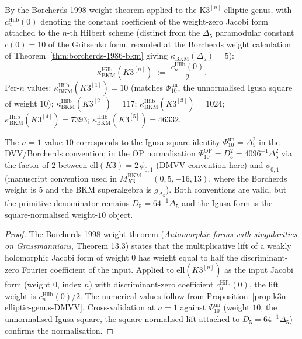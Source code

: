 \begin{proposition}
\label{prop:k3n-borcherds-weight}
By the Borcherds 1998 weight theorem applied to the K$3^{[n]}$ elliptic
genus, with $c_n^{\mathrm{Hilb}}(0)$ denoting the constant coefficient of
the weight-zero Jacobi form attached to the $n$-th Hilbert scheme
\textup{(}distinct from the $\Delta_5$ paramodular constant
$c(0) = 10$ of the Gritsenko form, recorded at the Borcherds weight
calculation of Theorem~\ref{thm:borcherds-1986-bkm} giving
$\kappa_{\mathrm{BKM}}(\Delta_5) = 5$\textup{):}
\[
 \boxed{\;
 \kappa_{\mathrm{BKM}}^{\mathrm{Hilb}}(K3^{[n]})
 \;:=\; \frac{c_n^{\mathrm{Hilb}}(0)}{2}.
 \;}
\]
Per-$n$ values: $\kappa_{\mathrm{BKM}}^{\mathrm{Hilb}}(K3^{[1]}) = 10$
\textup{(}matches \(\Phi_{10}^{\mathrm{un}}\), the unnormalised Igusa square of weight $10$\textup{);}
$\kappa_{\mathrm{BKM}}^{\mathrm{Hilb}}(K3^{[2]}) = 117$;
$\kappa_{\mathrm{BKM}}^{\mathrm{Hilb}}(K3^{[3]}) = 1024$;
$\kappa_{\mathrm{BKM}}^{\mathrm{Hilb}}(K3^{[4]}) = 7393$;
$\kappa_{\mathrm{BKM}}^{\mathrm{Hilb}}(K3^{[5]}) = 46332$.

The $n = 1$ value $10$ corresponds to the Igusa-square identity
\(\Phi_{10}^{\mathrm{un}}=\Delta_5^2\) in the DVV/Borcherds convention; in the OP normalisation
\(\Phi_{10}^{\mathrm{OP}}=D_5^2=4096^{-1}\Delta_5^2\) via the
factor of $2$ between $\mathrm{ell}(K3) = 2 \, \phi_{0, 1}$
\textup{(}DMVV convention here\textup{)} and $\phi_{0, 1}$
\textup{(}manuscript convention used in
$M_{K3}^{\mathrm{BKM}} = (0, 5, -16, 13)$, where the Borcherds weight is
$5$ and the BKM superalgebra is $g_{\Delta_5}$\textup{).} Both
conventions are valid, but the primitive denominator remains
\(D_5=64^{-1}\Delta_5\) and the Igusa form is the square-normalised
weight-\(10\) object.
\end{proposition}

\begin{proof}[Proof]
The Borcherds 1998 weight theorem
\textup{(}\textit{Automorphic forms with singularities on Grassmannians},
Theorem 13.3\textup{)} states that the multiplicative lift of a weakly
holomorphic Jacobi form of weight $0$ has weight equal to half the
discriminant-zero Fourier coefficient of the input. Applied to
$\mathrm{ell}(K3^{[n]})$ as the input Jacobi form
\textup{(}weight $0$, index $n$\textup{)} with discriminant-zero
coefficient $c_n^{\mathrm{Hilb}}(0)$, the lift weight is
$c_n^{\mathrm{Hilb}}(0) / 2$. The numerical values follow from
Proposition~\ref{prop:k3n-elliptic-genus-DMVV}. Cross-validation at
$n = 1$ against \(\Phi_{10}^{\mathrm{un}}\) \textup{(}weight $10$, the unnormalised Igusa square,
the square-normalised lift attached to
$D_5=64^{-1}\Delta_5$\textup{)} confirms the
normalisation.
\end{proof}

